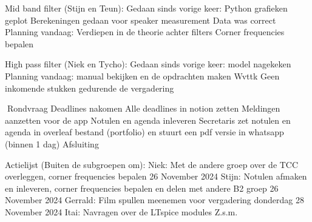 	Mid band filter (Stijn en Teun):
		Gedaan sinds vorige keer:
			Python grafieken geplot
			Berekeningen gedaan voor speaker measurement 
			Data was correct
		Planning vandaag:
			Verdiepen in de theorie achter filters
			Corner frequencies bepalen
		
	High pass filter (Niek en Tycho):
			Gedaan sinds vorige keer:
				model nagekeken
			Planning vandaag:
				manual bekijken en de opdrachten maken
Wvttk
	Geen inkomende stukken gedurende de vergadering
	
Rondvraag
	Deadlines nakomen
		Alle deadlines in notion zetten
		Meldingen aanzetten voor de app
	Notulen en agenda inleveren
		Secretaris zet notulen en agenda in overleaf bestand (portfolio) en stuurt een pdf 
		versie in whatsapp (binnen 1 dag)
Afsluiting


Actielijst (Buiten de subgroepen om):
	Niek: Met de andere groep over de TCC overleggen, corner frequencies bepalen
		26 November 2024
	Stijn: Notulen afmaken en inleveren, corner frequencies bepalen en delen met andere B2 
		groep
		26 November 2024
	Gerrald: Film spullen meenemen voor vergadering donderdag
		28 November 2024
	Itai: Navragen over de LTspice modules 
		Z.s.m.



